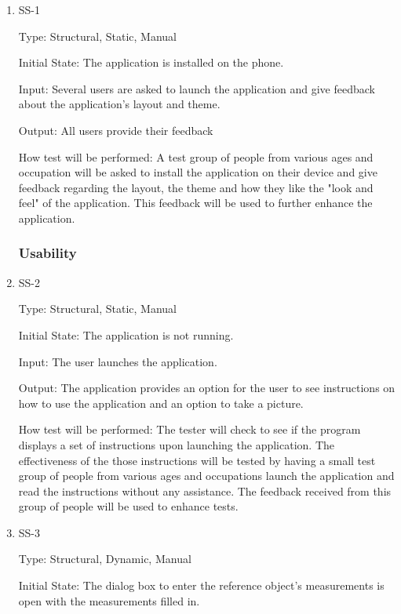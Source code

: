 \documentclass[12pt, titlepage]{article}
\begin{document}
\begin{enumerate}

\item{SS-1\\}

Type: Structural, Static, Manual
					
Initial State: The application is installed on the phone.
					
Input: Several users are asked to launch the application and give feedback about the application's layout and theme.
					
Output: All users provide their feedback
					
How test will be performed: A test group of people from various ages and occupation will be asked to install the application on their device and give feedback regarding the layout, the theme and how they like the "look and feel" of the application. This feedback will be used to further enhance the application.
					
\subsubsection{Usability}
\item{SS-2\\}

Type: Structural, Static, Manual
					
Initial State: The application is not running.
					
Input: The user launches the application.
					
Output: The application provides an option for the user to see instructions on how to use the application and an option to take a picture.
					
How test will be performed: The tester will check to see if the program displays a set of instructions upon launching the application. The effectiveness of the those instructions will be tested by having a small test group of people from various ages and occupations launch the application and read the instructions without any assistance. The feedback received from this group of people will be used to enhance tests.

\item{SS-3\\}

Type: Structural, Dynamic, Manual

Initial State: The dialog box to enter the reference object's measurements is open with the measurements filled in.


\end{enumerate}
\end{document}
